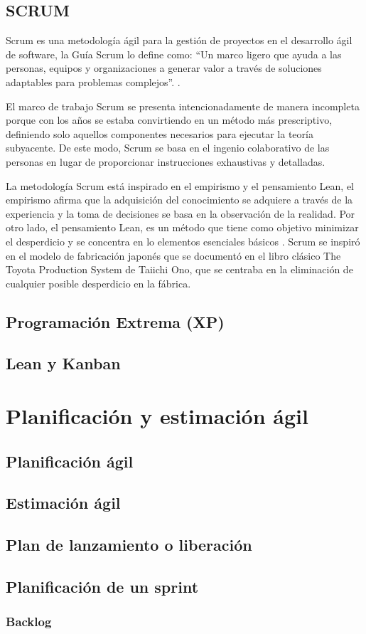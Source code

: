   \subsection{SCRUM}
  Scrum es una metodología ágil para la gestión de proyectos en el desarrollo ágil de software, la Guía Scrum lo define como: \enquote{Un marco ligero que ayuda a las personas, equipos y organizaciones a generar valor a través de soluciones adaptables para problemas complejos}. \parencite{scrumguide:2020}.
  
  El marco de trabajo Scrum se presenta intencionadamente de manera incompleta porque con los años se estaba convirtiendo en un método más prescriptivo, definiendo solo aquellos componentes necesarios para ejecutar la teoría subyacente. De este modo, Scrum se basa en el ingenio colaborativo de las personas en lugar de proporcionar instrucciones exhaustivas y detalladas.

  La metodología Scrum está inspirado en el empirismo y el pensamiento Lean, el empirismo afirma que la adquisición del conocimiento se adquiere a través de la experiencia y la toma de decisiones se basa en la observación de la realidad. Por otro lado, el pensamiento Lean, es un método que tiene como objetivo minimizar el desperdicio y se concentra en lo elementos esenciales básicos \parencite{scrumguide:2020}. Scrum se inspiró en el modelo de fabricación japonés que se documentó en el libro clásico The Toyota Production System de Taiichi Ono, que se centraba en la eliminación de cualquier posible desperdicio en la fábrica.

  \subsection{Programación Extrema (XP)}
  \subsection{Lean y Kanban}

\section{Planificación y estimación ágil}
  \subsection{Planificación ágil}
  \subsection{Estimación ágil}
  \subsection{Plan de lanzamiento o liberación}
  \subsection{Planificación de un sprint}
    \subsubsection{Backlog}
